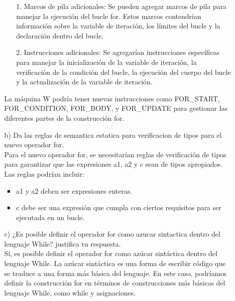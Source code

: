 \documentclass{article}
\begin{document}
\begin{itemize}
\begin{itemize}
            \begin{itemize}
                \item[1.] Marcos de pila adicionales: Se pueden agregar marcos de pila para manejar la ejecución del bucle for. Estos marcos contendrían información sobre la variable de iteración, los límites del bucle y la declaración dentro del bucle.

                \item[2.] Instrucciones adicionales: Se agregarían instrucciones específicas para manejar la inicialización de la variable de iteración, la verificación de la condición del bucle, la ejecución del cuerpo del bucle y la actualización de la variable de iteración.
            \end{itemize}

            La máquina W podría tener nuevas instrucciones como FOR\_START, FOR\_CONDITION, FOR\_BODY, y FOR\_UPDATE para gestionar las diferentes partes de la construcción for.

            \item[b)] Da las reglas de semantica estatica para verificacion de tipos para el nuevo operador for.\\

            Para el nuevo operador for, se necesitarían reglas de verificación de tipos para garantizar que las expresiones a1, a2 y c sean de tipos apropiados.\\

            Las reglas podrían incluir:

            \begin{itemize}
                \item a1 y a2 deben ser expresiones enteras.
                \item c debe ser una expresión que cumpla con ciertos requisitos para ser ejecutada en un bucle.
            \end{itemize}

            \item[c)] ¿Es posible definir el operador for como azucar sintactica dentro del lenguaje While? justifica tu respuesta.\\

            Sí, es posible definir el operador for como azúcar sintáctica dentro del lenguaje While. La azúcar sintáctica es una forma de escribir código que se traduce a una forma más básica del lenguaje. En este caso, podríamos definir la construcción for en términos de construcciones más básicas del lenguaje While, como while y asignaciones.\\ 


\end{itemize}
\end{itemize}
\end{document}
